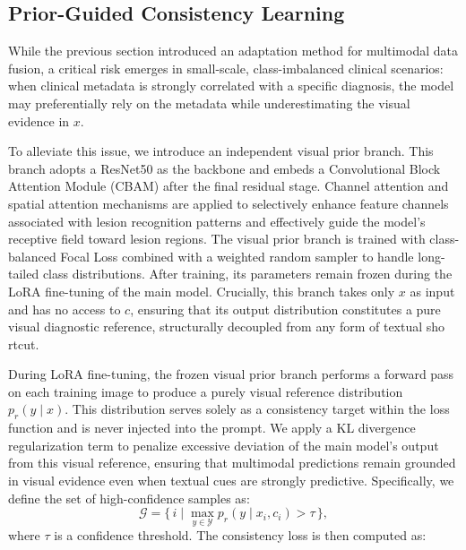 \documentclass[preprint,12pt]{elsarticle}
\begin{document}
\subsection{Prior-Guided Consistency Learning}

While the previous section introduced an adaptation method for multimodal data fusion, a critical risk emerges in small-scale, class-imbalanced clinical scenarios: when clinical metadata is strongly correlated with a specific diagnosis, the model may preferentially rely on the metadata while underestimating the visual evidence in $x$.


To alleviate this issue, we introduce an independent visual prior branch. This branch adopts a
ResNet50 as the backbone and embeds a Convolutional Block Attention
Module (CBAM) \cite{woo2018cbam} after the final residual stage. Channel attention and spatial attention mechanisms are applied to selectively enhance feature channels associated with lesion recognition patterns and effectively guide the model's receptive field toward lesion regions. The visual prior branch is trained with class-balanced Focal Loss\cite{lin2017focal} combined with a weighted random sampler to handle long-tailed class distributions. After training, its parameters remain frozen during the LoRA fine-tuning of the main model. Crucially, this branch takes only $x$ as input and has no access to $c$, ensuring that its output distribution constitutes a pure visual diagnostic reference, structurally decoupled from any form of textual sho
rtcut.


During LoRA fine-tuning, the frozen visual prior branch performs a forward pass on each training image to produce a purely visual reference distribution $p_r(y\mid x)$. This distribution serves solely as a consistency target within the loss function and is never injected into the prompt. We apply a KL divergence regularization term to penalize excessive deviation of the main model's output from this visual reference, ensuring that multimodal predictions remain grounded in visual evidence even when textual cues are strongly predictive. Specifically, we define the set of high-confidence samples as: \begin{equation}
	\mathcal{G} = \{\, i \mid \max_{y \in \mathcal{Y}} p_r(y \mid x_i, c_i) > \tau \,\},
	\label{eq:gated_set}
\end{equation}
%
where $\tau$ is a confidence threshold. The consistency loss is then computed as:
\end{document}
